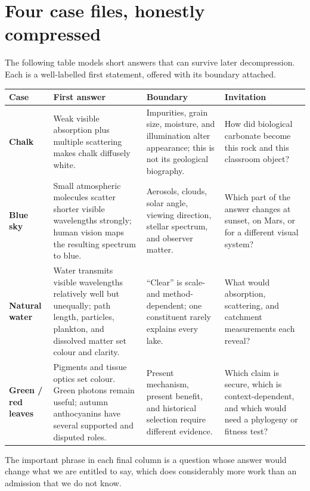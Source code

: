 \section{Four case files, honestly compressed}

The following table models short answers that can survive later decompression. Each is a well-labelled first statement, offered with its boundary attached.

\begin{center}
\footnotesize
\renewcommand{\arraystretch}{1.26}
\begin{tabularx}{\linewidth}{>{\bfseries\color{night}}p{.115\linewidth}>{\raggedright\arraybackslash}p{.245\linewidth}>{\raggedright\arraybackslash}p{.26\linewidth}X}
\toprule
\textbf{Case} & \textbf{First answer} & \textbf{Boundary} & \textbf{Invitation} \\
\midrule
Chalk & Weak visible absorption plus multiple scattering makes chalk diffusely white. & Impurities, grain size, moisture, and illumination alter appearance; this is not its geological biography. & How did biological carbonate become this rock and this classroom object? \\
\addlinespace
Blue sky & Small atmospheric molecules scatter shorter visible wavelengths strongly; human vision maps the resulting spectrum to blue. & Aerosols, clouds, solar angle, viewing direction, stellar spectrum, and observer matter. & Which part of the answer changes at sunset, on Mars, or for a different visual system? \\
\addlinespace
Natural water & Water transmits visible wavelengths relatively well but unequally; path length, particles, plankton, and dissolved matter set colour and clarity. & ``Clear'' is scale- and method-dependent; one constituent rarely explains every lake. & What would absorption, scattering, and catchment measurements each reveal? \\
\addlinespace
Green / red leaves & Pigments and tissue optics set colour. Green photons remain useful; autumn anthocyanins have several supported and disputed roles. & Present mechanism, present benefit, and historical selection require different evidence. & Which claim is secure, which is context-dependent, and which would need a phylogeny or fitness test? \\
\bottomrule
\end{tabularx}
\end{center}

The important phrase in each final column is a question whose answer would change what we are entitled to say, which does considerably more work than an admission that we do not know.


